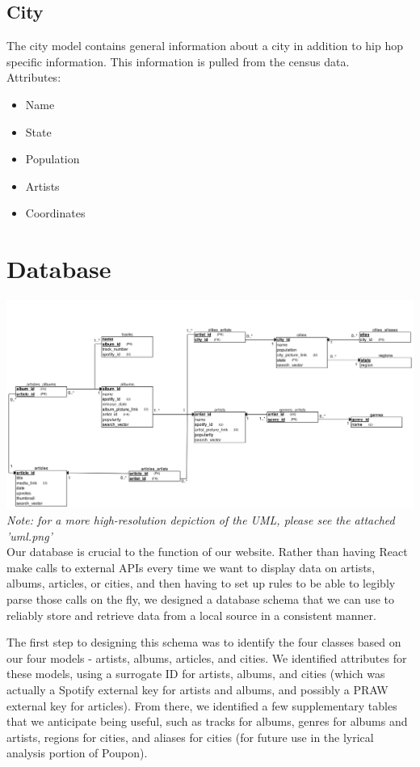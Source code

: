 \documentclass{scrartcl}
\begin{document}
    \subsection{City}\label{subsec:city}
    The city model contains general information about a city in addition to hip hop specific information.
    This information is pulled from the census data.\\

    Attributes:
    \begin{itemize}
        \item Name
        \item State
        \item Population
        \item Artists
        \item Coordinates
    \end{itemize}

    \section{Database}\label{sec:database}
    \includegraphics[width=1\textwidth]{uml}
    \textit{Note: for a more high-resolution depiction of the UML, please see the attached 'uml.png'}\\

    Our database is crucial to the function of our website.
    Rather than having React make calls to external APIs every time we want to display data on artists, albums, articles, or cities, and then having to set up rules to be able to legibly parse those calls on the fly, we designed a database schema that we can use to reliably store and retrieve data from a local source in a consistent manner.

    The first step to designing this schema was to identify the four classes based on our four models - artists, albums, articles, and cities.
    We identified attributes for these models, using a surrogate ID for artists, albums, and cities (which was actually a Spotify external key for artists and albums, and possibly a PRAW external key for articles).
    From there, we identified a few supplementary tables that we anticipate being useful, such as tracks for albums, genres for albums and artists, regions for cities, and aliases for cities (for future use in the lyrical analysis portion of Poupon).
\end{document}
